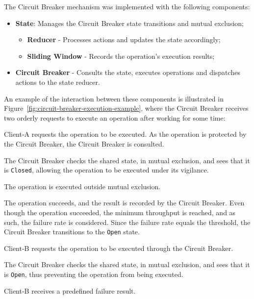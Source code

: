 The Circuit Breaker mechanism was implemented with the following components:

\begin{itemize}
    \item \textbf{State}: Manages the Circuit Breaker state transitions and mutual exclusion;
    \begin{itemize}
        \item \textbf{Reducer} - Processes actions and updates the state accordingly;
        \item \textbf{Sliding Window} - Records the operation's execution results;
    \end{itemize}
    \item \textbf{Circuit Breaker} - Consults the state, executes operations and dispatches actions to the state reducer.
\end{itemize}

An example of the interaction between these components is illustrated in Figure~\ref{fig:circuit-breaker-execution-example},
where the Circuit Breaker receives two orderly requests to execute an operation after working for some time:

\begin{boldenumerate}
    \item Client-A requests the operation to be executed.
    As the operation is protected by the Circuit Breaker, the Circuit Breaker is consulted.
    \item The Circuit Breaker checks the shared state, in mutual exclusion,
    and sees that it is \texttt{Closed}, allowing the operation to be executed under its vigilance.
    \item The operation is executed outside mutual exclusion.
    \item The operation succeeds, and the result is recorded by the Circuit Breaker.
    Even though the operation succeeded, the minimum throughput is reached,
    and as such, the failure rate is considered.
    Since the failure rate equals the threshold, the Circuit Breaker transitions to the \texttt{Open} state.
    \item Client-B requests the operation to be executed through the Circuit Breaker.
    \item The Circuit Breaker checks the shared state, in mutual exclusion, and sees that it is \texttt{Open}, thus preventing the operation from being executed.
    \item Client-B receives a predefined failure result.
\end{boldenumerate}

